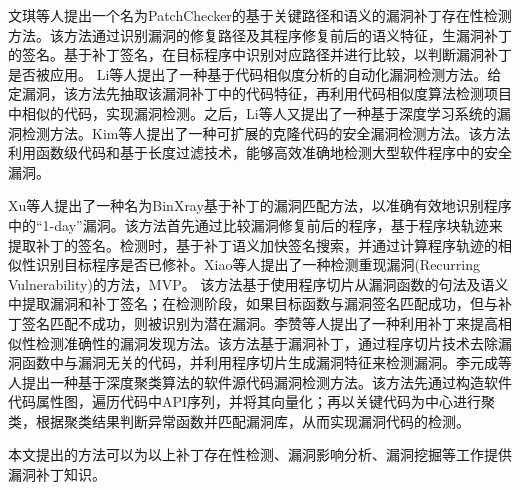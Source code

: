 文琪等人\cite{8文琪2020}提出一个名为PatchChecker的基于关键路径和语义的漏洞补丁存在性检测方法。该方法通过识别漏洞的修复路径及其程序修复前后的语义特征，生漏洞补丁的签名。基于补丁签名，在目标程序中识别对应路径并进行比较，以判断漏洞补丁是否被应用。%
Li等人\cite{li2016vulpecker}提出了一种基于代码相似度分析的自动化漏洞检测方法。给定漏洞，该方法先抽取该漏洞补丁中的代码特征，再利用代码相似度算法检测项目中相似的代码，实现漏洞检测。之后，Li等人\cite{li2018vuldeepecker}又提出了一种基于深度学习系统的漏洞检测方法。Kim等人\cite{kim2017vuddy}提出了一种可扩展的克隆代码的安全漏洞检测方法。该方法利用函数级代码和基于长度过滤技术，能够高效准确地检测大型软件程序中的安全漏洞。

Xu等人\cite{xu2020patch}提出了一种名为BinXray基于补丁的漏洞匹配方法，以准确有效地识别程序中的“1-day”漏洞。该方法首先通过比较漏洞修复前后的程序，基于程序块轨迹来提取补丁的签名。检测时，基于补丁语义加快签名搜索，并通过计算程序轨迹的相似性识别目标程序是否已修补。Xiao等人\cite{xiao2020mvp}提出了一种检测重现漏洞(Recurring Vulnerability)的方法，MVP。 该方法基于使用程序切片从漏洞函数的句法及语义中提取漏洞和补丁签名；在检测阶段，如果目标函数与漏洞签名匹配成功，但与补丁签名匹配不成功，则被识别为潜在漏洞。李赞等人\cite{22李赞2018}提出了一种利用补丁来提高相似性检测准确性的漏洞发现方法。该方法基于漏洞补丁，通过程序切片技术去除漏洞函数中与漏洞无关的代码，并利用程序切片生成漏洞特征来检测漏洞。李元成等人\cite{23李元诚2020}提出一种基于深度聚类算法的软件源代码漏洞检测方法。该方法先通过构造软件代码属性图，遍历代码中API序列，并将其向量化；再以关键代码为中心进行聚类，根据聚类结果判断异常函数并匹配漏洞库，从而实现漏洞代码的检测。

本文提出的方法可以为以上补丁存在性检测、漏洞影响分析、漏洞挖掘等工作提供漏洞补丁知识。


